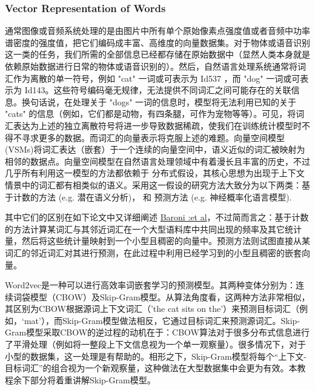 \subsubsection{Vector Representation of Words}
通常图像或音频系统处理的是由图片中所有单个原始像素点强度值或者音频中功率谱密度的强度值，把它们编码成丰富、高维度的向量数据集。对于物体或语音识别这一类的任务，我们所需的全部信息已经都存储在原始数据中（显然人类本身就是依赖原始数据进行日常的物体或语音识别的）。然后，自然语言处理系统通常将词汇作为离散的单一符号，例如 "cat" 一词或可表示为 Id537 ，而 "dog" 一词或可表示为 Id143。这些符号编码毫无规律，无法提供不同词汇之间可能存在的关联信息。换句话说，在处理关于 "dogs" 一词的信息时，模型将无法利用已知的关于 "cats" 的信息（例如，它们都是动物，有四条腿，可作为宠物等等）。可见，将词汇表达为上述的独立离散符号将进一步导致数据稀疏，使我们在训练统计模型时不得不寻求更多的数据。而词汇的向量表示将克服上述的难题。向量空间模型 (VSMs)将词汇表达（嵌套）于一个连续的向量空间中，语义近似的词汇被映射为相邻的数据点。向量空间模型在自然语言处理领域中有着漫长且丰富的历史，不过几乎所有利用这一模型的方法都依赖于 分布式假设，其核心思想为出现于上下文情景中的词汇都有相类似的语义。采用这一假设的研究方法大致分为以下两类：基于计数的方法 (e.g. 潜在语义分析)， 和 预测方法 (e.g. 神经概率化语言模型).

其中它们的区别在如下论文中又详细阐述 \href{http://clic.cimec.unitn.it/marco/publications/acl2014/baroni-etal-countpredict-acl2014.pdf}{Baroni :et al}，不过简而言之：基于计数的方法计算某词汇与其邻近词汇在一个大型语料库中共同出现的频率及其它统计量，然后将这些统计量映射到一个小型且稠密的向量中。预测方法则试图直接从某词汇的邻近词汇对其进行预测，在此过程中利用已经学习到的小型且稠密的嵌套向量。

Word2vec是一种可以进行高效率词嵌套学习的预测模型。其两种变体分别为：连续词袋模型（CBOW）及Skip-Gram模型。从算法角度看，这两种方法非常相似，其区别为CBOW根据源词上下文词汇（'the cat sits on the'）来预测目标词汇（例如，‘mat’），而Skip-Gram模型做法相反，它通过目标词汇来预测源词汇。Skip-Gram模型采取CBOW的逆过程的动机在于：CBOW算法对于很多分布式信息进行了平滑处理（例如将一整段上下文信息视为一个单一观察量）。很多情况下，对于小型的数据集，这一处理是有帮助的。相形之下，Skip-Gram模型将每个“上下文-目标词汇”的组合视为一个新观察量，这种做法在大型数据集中会更为有效。本教程余下部分将着重讲解Skip-Gram模型。
